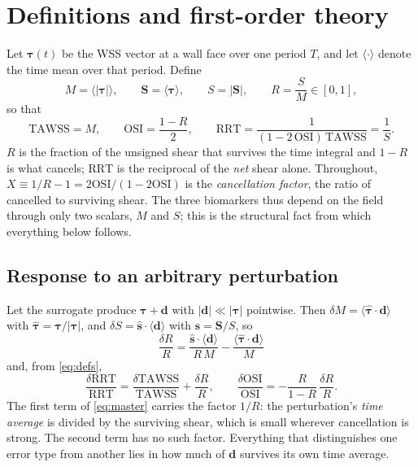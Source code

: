 \documentclass[11pt,a4paper]{article}
\newcommand{\TAWSS}{\mathrm{TAWSS}}
\newcommand{\OSI}{\mathrm{OSI}}
\newcommand{\RRT}{\mathrm{RRT}}
\begin{document}
\section{Definitions and first-order theory}
\label{sec:theory}

Let $\boldsymbol\tau(t)$ be the WSS vector at a wall face over one period
$T$, and let $\langle\cdot\rangle$ denote the time mean over that period.
Define
\begin{equation}
M=\langle|\boldsymbol\tau|\rangle,\qquad
\mathbf S=\langle\boldsymbol\tau\rangle,\qquad
S=|\mathbf S|,\qquad
R=\frac{S}{M}\in[0,1],
\end{equation}
so that
\begin{equation}
\TAWSS=M,\qquad
\OSI=\frac{1-R}{2},\qquad
\RRT=\frac{1}{(1-2\,\OSI)\,\TAWSS}=\frac{1}{S}.
\label{eq:defs}
\end{equation}
$R$ is the fraction of the unsigned shear that survives the time integral and
$1-R$ is what cancels; $\RRT$ is the reciprocal of the \emph{net} shear
alone. Throughout, $X\equiv1/R-1=2\OSI/(1-2\OSI)$ is the \emph{cancellation
factor}, the ratio of cancelled to surviving shear. The three biomarkers thus
depend on the field through only two scalars, $M$ and $S$; this is the
structural fact from which everything below follows.

\subsection{Response to an arbitrary perturbation}

Let the surrogate produce $\boldsymbol\tau+\mathbf d$ with
$|\mathbf d|\ll|\boldsymbol\tau|$ pointwise. Then
$\delta M=\langle\hat{\boldsymbol\tau}\cdot\mathbf d\rangle$ with
$\hat{\boldsymbol\tau}=\boldsymbol\tau/|\boldsymbol\tau|$, and
$\delta S=\hat{\mathbf s}\cdot\langle\mathbf d\rangle$ with
$\hat{\mathbf s}=\mathbf S/S$, so
\begin{equation}
\boxed{\;\frac{\delta R}{R}
=\frac{\hat{\mathbf s}\cdot\langle\mathbf d\rangle}{R\,M}
-\frac{\langle\hat{\boldsymbol\tau}\cdot\mathbf d\rangle}{M}\;}
\label{eq:master}
\end{equation}
and, from \eqref{eq:defs},
\begin{equation}
\frac{\delta\RRT}{\RRT}=\frac{\delta\TAWSS}{\TAWSS}+\frac{\delta R}{R},
\qquad
\frac{\delta\OSI}{\OSI}=-\frac{R}{1-R}\,\frac{\delta R}{R}.
\label{eq:chain}
\end{equation}
The first term of \eqref{eq:master} carries the factor $1/R$: the
perturbation's \emph{time average} is divided by the surviving shear, which
is small wherever cancellation is strong. The second term has no such factor.
Everything that distinguishes one error type from another lies in how much of
$\mathbf d$ survives its own time average.
\end{document}
